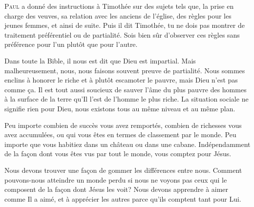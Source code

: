 

\lettrine{P}{aul} a donné des instructions à Timothée
 sur des sujets tels que, la prise en charge des veuves,
 sa relation avec les anciens de l'église, des règles pour les jeunes femmes,
 et ainsi de suite. Puis il dit\frcolon{} 
 \Og Timothée, 
 tu ne dois pas montrer de traitement préférentiel ou de partialité.
 Sois bien sûr d'observer ces règles sans préférence pour l'un plutôt
 que pour l'autre. \Fg{}

Dans toute la Bible, il nous est dit que Dieu est impartial.
 Mais malheureusement, nous, nous faisons souvent preuve de partialité.
 Nous sommes enclins à honorer le riche et à plutôt escamoter le pauvre,
 mais Dieu n'est pas comme \c{c}a. Il est tout aussi soucieux de sauver l'âme
 du plus pauvre des hommes à la surface de la terre qu'Il l'est de l'homme
 le plus riche. La situation sociale ne signifie rien pour Dieu,
 nous existons tous au même niveau et au même plan. 


Peu importe combien de succès vous avez remportés, combien de richesses
 vous avez accumulées, ou qui vous êtes en termes de classement par le monde.
 Peu importe que vous habitiez dans un château ou dans une cabane.
 Indépendamment de la fa\c{c}on dont vous êtes vus par tout le monde,
 vous comptez pour Jésus. 

Nous devons trouver une fa\c{c}on de gommer les différences entre nous.
 Comment pouvons-nous atteindre un monde perdu si nous ne voyons pas
 ceux qui le composent de la fa\c{c}on dont Jésus les voit?
 Nous devons apprendre à aimer comme Il a aimé, et à apprécier les autres
 parce qu'ils comptent tant pour Lui.

\dvrule






